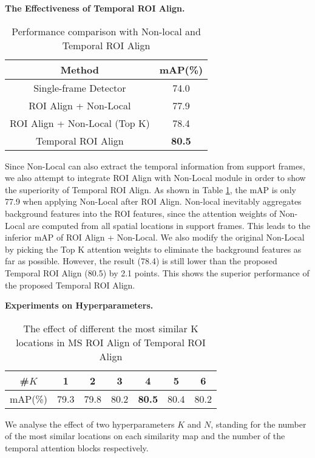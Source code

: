 \documentclass[letterpaper]{article} \usepackage{aaai21}  \usepackage{times}  \usepackage{helvet} \usepackage{courier}  \usepackage[hyphens]{url}  \usepackage{graphicx} \usepackage{hyperref}
\begin{document}
\noindent\textbf{The Effectiveness of Temporal ROI Align.}
\begin{table}[t]
\begin{center}
\begin{tabular}{c|c}
  \hline
  \hline
  Method & mAP(\%) \\
  \hline
  \hline
  Single-frame Detector & 74.0 \\
  \hline
  ROI Align + Non-Local & 77.9 \\
  ROI Align + Non-Local (Top K) & 78.4 \\
  Temporal ROI Align & \textbf{80.5}\\
  \hline
  \hline
\end{tabular}
\end{center}
\vspace{-0.2cm}
\caption{Performance comparison with Non-local and Temporal ROI Align}
\label{t:non-local}
\vspace{-0.2cm}
\end{table}
Since Non-Local \cite{wang2018non} can also extract the temporal information from support frames, we also attempt to integrate ROI Align with Non-Local  module in order to show the superiority of Temporal ROI Align.  As shown in Table \ref{t:non-local}, the mAP is only 77.9 when applying Non-Local after ROI Align. Non-local inevitably aggregates background features into the ROI features, since the attention weights of Non-Local are computed from all spatial locations in  support frames. This leads to the inferior mAP of ROI Align + Non-Local. We also modify the original Non-Local by picking the Top K attention weights to eliminate the background features as far as possible. However, the result (78.4) is still lower than the proposed Temporal ROI Align (80.5) by 2.1 points. This shows the superior performance of the proposed Temporal ROI Align.

\noindent\textbf{Experiments on Hyperparameters.}
\begin{table}[t]
\begin{center}
\begin{tabular}{c|c|c|c|c|c|c}
  \hline
  \hline
  \#$K$ & 1 & 2 & 3 & 4 & 5 & 6\\
  \hline
  mAP(\%) &79.3 & 79.8 & 80.2 & \textbf{80.5} & 80.4 & 80.2\\
  \hline
  \hline
\end{tabular}
\end{center}
\vspace{-0.2cm}
\caption{The effect of different the most similar K locations in MS ROI Align of Temporal ROI Align}
\label{t:topk}
\end{table}
We analyse the effect of two hyperparameters $K$ and $N$, standing for the number of the most similar locations on each similarity map and the number of the temporal attention blocks respectively.
\end{document}
